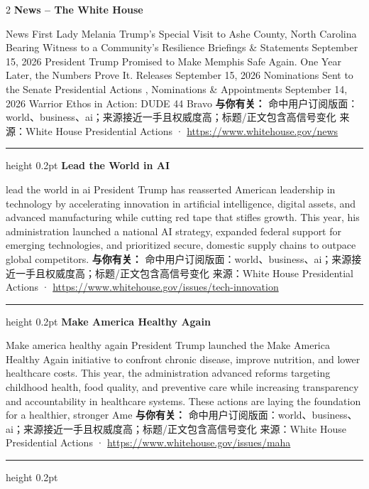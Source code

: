 \documentclass[10.5pt]{ctexart}
\begin{document}
\begin{multicols}{2}
{\large\bfseries News – The White House}\par
News First Lady Melania Trump’s Special Visit to Ashe County, North Carolina Bearing Witness to a Community’s Resilience Briefings \& Statements September 15, 2026 President Trump Promised to Make Memphis Safe Again. One Year Later, the Numbers Prove It. Releases September 15, 2026 Nominations Sent to the Senate Presidential Actions , Nominations \& Appointments September 14, 2026 Warrior Ethos in Action: DUDE 44 Bravo
\textbf{与你有关：} 命中用户订阅版面：world、business、ai；来源接近一手且权威度高；标题/正文包含高信号变化
{\footnotesize\color{ormuted} 来源：White House Presidential Actions · \url{https://www.whitehouse.gov/news}}
\vspace{2mm}
\hrule height 0.2pt
\vspace{2mm}
{\large\bfseries Lead the World in AI}\par
lead the world in ai President Trump has reasserted American leadership in technology by accelerating innovation in artificial intelligence, digital assets, and advanced manufacturing while cutting red tape that stifles growth. This year, his administration launched a national AI strategy, expanded federal support for emerging technologies, and prioritized secure, domestic supply chains to outpace global competitors.
\textbf{与你有关：} 命中用户订阅版面：world、business、ai；来源接近一手且权威度高；标题/正文包含高信号变化
{\footnotesize\color{ormuted} 来源：White House Presidential Actions · \url{https://www.whitehouse.gov/issues/tech-innovation}}
\vspace{2mm}
\hrule height 0.2pt
\vspace{2mm}
{\large\bfseries Make America Healthy Again}\par
Make america healthy again President Trump launched the Make America Healthy Again initiative to confront chronic disease, improve nutrition, and lower healthcare costs. This year, the administration advanced reforms targeting childhood health, food quality, and preventive care while increasing transparency and accountability in healthcare systems. These actions are laying the foundation for a healthier, stronger Ame
\textbf{与你有关：} 命中用户订阅版面：world、business、ai；来源接近一手且权威度高；标题/正文包含高信号变化
{\footnotesize\color{ormuted} 来源：White House Presidential Actions · \url{https://www.whitehouse.gov/issues/maha}}
\vspace{2mm}
\hrule height 0.2pt
\vspace{2mm}

\end{multicols}
\end{document}
